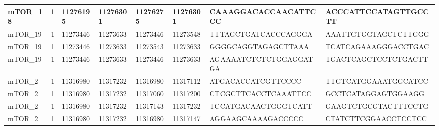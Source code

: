 \begin{landscape}
\begin{longtable}{| p{} | p{} | p{} | p{} | p{} | p{} | p{} | p{} |}
\multicolumn{1}{|l|}{mTOR\_18}   & \multicolumn{1}{c|}{1}  & \multicolumn{1}{l|}{11276195}  & \multicolumn{1}{l|}{11276301}  & \multicolumn{1}{l|}{11276275}  & \multicolumn{1}{l|}{11276301}  & \multicolumn{1}{l|}{CAAAGGACACCAACATTCCC}            & \multicolumn{1}{l|}{ACCCATTCCATAGTTGCCTT}          \\ \hline
\multicolumn{1}{|l|}{mTOR\_19}   & \multicolumn{1}{c|}{1}  & \multicolumn{1}{l|}{11273446}  & \multicolumn{1}{l|}{11273633}  & \multicolumn{1}{l|}{11273446}  & \multicolumn{1}{l|}{11273548}  & \multicolumn{1}{l|}{TTTAGCTGATCACCCAGGGA}            & \multicolumn{1}{l|}{AAATTGTGGTAGCTCTTGGG}          \\ \hline
\multicolumn{1}{|l|}{mTOR\_19}   & \multicolumn{1}{c|}{1}  & \multicolumn{1}{l|}{11273446}  & \multicolumn{1}{l|}{11273633}  & \multicolumn{1}{l|}{11273543}  & \multicolumn{1}{l|}{11273633}  & \multicolumn{1}{l|}{GGGGCAGGTAGAGCTTAAA}             & \multicolumn{1}{l|}{TCATCAGAAAGGGACCTGAC}          \\ \hline
\multicolumn{1}{|l|}{mTOR\_19}   & \multicolumn{1}{c|}{1}  & \multicolumn{1}{l|}{11273446}  & \multicolumn{1}{l|}{11273633}  & \multicolumn{1}{l|}{11273446}  & \multicolumn{1}{l|}{11273633}  & \multicolumn{1}{l|}{AGAAAATCTCTCTGGAGGATGA}          & \multicolumn{1}{l|}{TGACTCAGCTCCTCTGACTT}          \\ \hline
\multicolumn{1}{|l|}{mTOR\_2}    & \multicolumn{1}{c|}{1}  & \multicolumn{1}{l|}{11316980}  & \multicolumn{1}{l|}{11317232}  & \multicolumn{1}{l|}{11316980}  & \multicolumn{1}{l|}{11317112}  & \multicolumn{1}{l|}{ATGACACCATCGTTCCCC}              & \multicolumn{1}{l|}{TTGTCATGGAAATGGCATCC}          \\ \hline
\multicolumn{1}{|l|}{mTOR\_2}    & \multicolumn{1}{c|}{1}  & \multicolumn{1}{l|}{11316980}  & \multicolumn{1}{l|}{11317232}  & \multicolumn{1}{l|}{11317060}  & \multicolumn{1}{l|}{11317200}  & \multicolumn{1}{l|}{CTCGCTTCACCTCAAATTCC}            & \multicolumn{1}{l|}{GCCTCATAGGAGTGGAAGG}           \\ \hline
\multicolumn{1}{|l|}{mTOR\_2}    & \multicolumn{1}{c|}{1}  & \multicolumn{1}{l|}{11316980}  & \multicolumn{1}{l|}{11317232}  & \multicolumn{1}{l|}{11317143}  & \multicolumn{1}{l|}{11317232}  & \multicolumn{1}{l|}{TCCATGACAACTGGGTCATT}            & \multicolumn{1}{l|}{GAAGTCTGCGTACTTTCCTG}          \\ \hline
\multicolumn{1}{|l|}{mTOR\_2}    & \multicolumn{1}{c|}{1}  & \multicolumn{1}{l|}{11316980}  & \multicolumn{1}{l|}{11317232}  & \multicolumn{1}{l|}{11316980}  & \multicolumn{1}{l|}{11317147}  & \multicolumn{1}{l|}{AGGAAGCAAAAGACCCCC}              & \multicolumn{1}{l|}{CTATCTTCGGAACCTCCTCC}          \\ \hline

\end{longtable}
\end{landscape}
